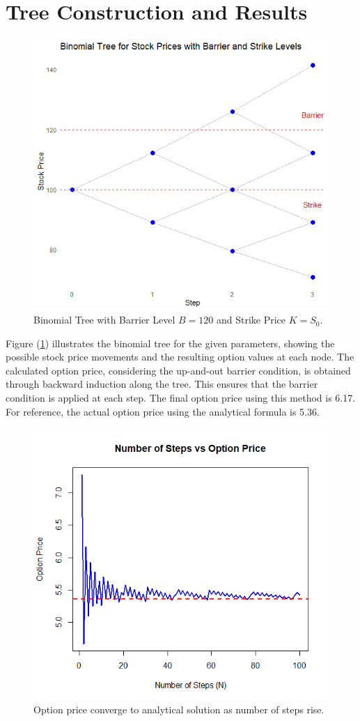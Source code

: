 \section{Tree Construction and Results}
\begin{figure}[h]
    \centering
    \includegraphics[width=.75\linewidth]{content/images/three-step.png}
    \caption{Binomial Tree with Barrier Level \(B = 120\) and Strike Price \(K = S_0\).}
    \label{fig:binomial-tree}
\end{figure}
Figure (\ref{fig:binomial-tree}) illustrates the binomial tree for the given parameters, showing the possible stock price movements and the resulting option values at each node. The calculated option price, considering the up-and-out barrier condition, is obtained through backward induction along the tree. This ensures that the barrier condition is applied at each step. The final option price using this method is 6.17. For reference, the actual option price using the analytical formula is 5.36.

\begin{figure}[h]
    \centering
    \includegraphics[width=.65\linewidth]{content/images/numstepsvsoptionprice.png}
    \caption{Option price converge to analytical solution as number of steps rise.}
    \label{fig:binom-nofsteps}
\end{figure}

